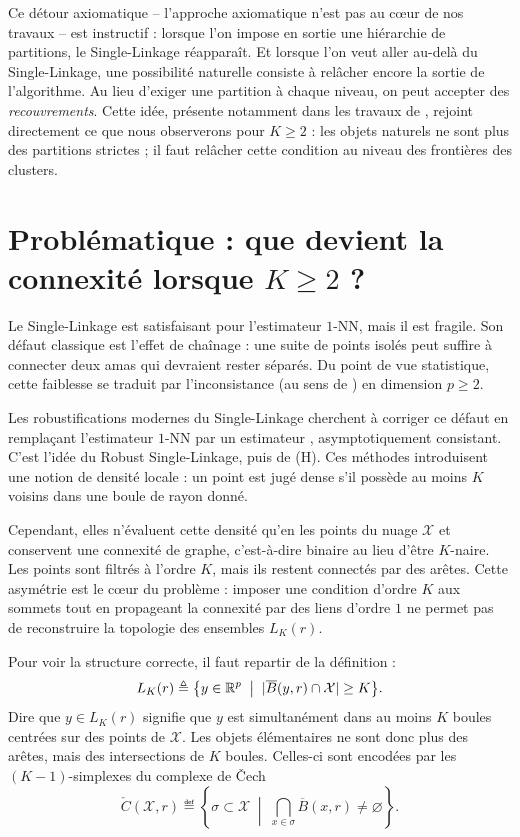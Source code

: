 Ce détour axiomatique -- l'approche axiomatique n'est pas au cœur de nos travaux -- est instructif : lorsque l'on impose en sortie une hiérarchie de partitions, le Single-Linkage réapparaît. Et lorsque l'on veut aller au-delà du Single-Linkage, une possibilité naturelle consiste à relâcher encore la sortie de l'algorithme. 
Au lieu d'exiger une partition à chaque niveau, on peut accepter des \emph{recouvrements}. Cette idée, présente notamment dans les travaux de  \cite{CulbertsonGuralnikStiller2018}, rejoint directement ce que nous observerons pour $K\geq2$ : les objets naturels ne sont plus des partitions strictes ; il faut relâcher cette condition au niveau des frontières des clusters.

\section{Problématique : que devient la connexité lorsque $K\geq2$ ?}

Le Single-Linkage est satisfaisant pour l'estimateur $1$-NN, mais il est fragile.
Son défaut classique est l'effet de chaînage : une suite de points isolés peut suffire à connecter deux amas qui devraient rester séparés. 
Du point de vue statistique, cette faiblesse se traduit par l'inconsistance (au sens de ) en dimension $p\geq2$.

Les robustifications modernes du Single-Linkage cherchent à corriger ce défaut en remplaçant l'estimateur $1$-NN par un estimateur \KNN, asymptotiquement consistant. 
C'est l'idée du Robust Single-Linkage, puis de (H)\DBSCAN. 
Ces méthodes introduisent une notion de densité locale : un point est jugé dense s'il possède au moins $K$ voisins dans une boule de rayon donné.

Cependant, elles n'évaluent cette densité qu'en les points du nuage $\mathcal X$ et conservent une connexité de graphe, c'est-à-dire binaire au lieu d'être $K$-naire. Les points sont filtrés à l'ordre $K$, mais ils restent connectés par des arêtes. Cette asymétrie est le cœur du problème : imposer une condition d'ordre $K$ aux sommets tout en propageant la connexité par des liens d'ordre $1$ ne permet pas de reconstruire la topologie des ensembles $L_K(r)$.

Pour voir la structure correcte, il faut repartir de la définition :
\[
    L_K(r)
    \triangleq
    \bigl\{
        y\in\mathbb{R}^p
        \;\bigm|\;
        \lvert \overline B(y,r)\cap \mathcal X \rvert \geq K
    \bigr\}.
\]
Dire que $y\in L_K(r)$ signifie que $y$ est simultanément dans au moins $K$ boules centrées sur des points de $\mathcal X$. 
Les objets élémentaires ne sont donc plus des arêtes, mais des intersections de $K$ boules. Celles-ci sont encodées par les $(K-1)$-simplexes du complexe de \v{C}ech
\[
    \check{C}(\mathcal X,r)
    \eqdef
    \left\{
        \sigma\subset \mathcal X
        \;\middle|\;
        \bigcap_{x\in\sigma} \overline B(x,r) \neq \varnothing
    \right\}.
\]

